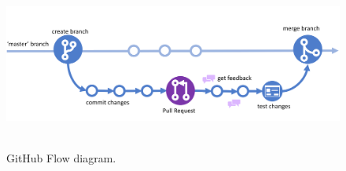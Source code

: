 ﻿\begin{figure}[H]
    \centering
    \includegraphics[width=1\textwidth]{img/GitHub_Flow}
    ~\caption{GitHub Flow diagram.}\label{fig:github-flow}
\end{figure}
